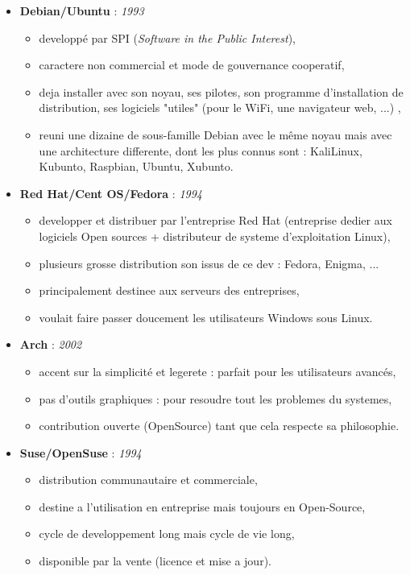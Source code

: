 \begin{itemize}
\item \textbf{Debian/Ubuntu} : \textit{1993}
    \begin{itemize}
    \item developpé par SPI (\textit{Software in the Public Interest}),
	\item caractere non commercial et mode de gouvernance cooperatif,
	\item deja installer avec son noyau, ses pilotes, son programme d'installation de distribution, ses logiciels "utiles" (pour le WiFi, une navigateur web, ...) ,
	\item reuni une dizaine de sous-famille Debian avec le même noyau mais avec une architecture differente, dont les plus connus sont : KaliLinux, Kubunto, Raspbian, Ubuntu, Xubunto.\newline 
    \end{itemize}
   
\item \textbf{Red Hat/Cent OS/Fedora} : \textit{1994}
    \begin{itemize}
	\item developper et distribuer par l'entreprise Red Hat (entreprise dedier aux logiciels Open sources + distributeur de systeme d'exploitation Linux),
	\item plusieurs grosse distribution son issus de ce dev : Fedora, Enigma, ...
	\item principalement destinee aux serveurs des entreprises,
	\item voulait faire passer doucement les utilisateurs Windows sous Linux.\newline
	\end{itemize}

\item \textbf{Arch} : \textit{2002}
    \begin{itemize}
	\item accent sur la simplicité et legerete : parfait pour les utilisateurs avancés,
	\item pas d'outils graphiques : pour resoudre tout les problemes du systemes,
	\item contribution ouverte (OpenSource) tant que cela respecte sa philosophie.\newline
	\end{itemize}
	
\item \textbf{Suse/OpenSuse} : \textit{1994}
    \begin{itemize}
	\item distribution communautaire et commerciale,
	\item destine a l'utilisation en entreprise mais toujours en Open-Source,
	\item cycle de developpement long mais cycle de vie long,
	\item disponible par la vente (licence et mise a jour).
	\end{itemize}
\end{itemize}

